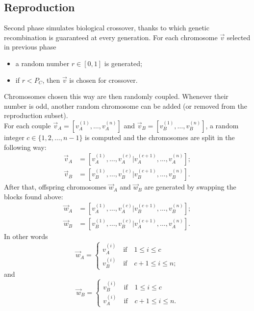 \documentclass[%
    corpo=11pt,
    twoside,
    stile=classica,
    oldstyle,
    autoretitolo,
    tipotesi=magistrale,
    greek,
    evenboxes,
    english
]{toptesi}
\begin{document}
\subsection{Reproduction}
Second phase simulates biological crossover, thanks to which genetic recombination is guaranteed at every generation. For each chromosome $\vec{v}$ selected in previous phase
\begin{itemize}
\item a random number  $r\in \left[0,1\right]$ is generated;
\item if $r < P_C$, then $\vec{v}$ is chosen for crossover.
\end{itemize}
Chromosomes chosen this way are then randomly coupled. Whenever their number is odd, another random chromosome can be added (or removed from the reproduction subset).\\
For each couple $\vec{v}_A = \left[v_A^{(1)}, \dots, v_A^{(n)} \right] $ and $\vec{v}_B = \left[v_B^{(1)}, \dots, v_B^{(n)} \right] $, a random integer 
$c \in \{1, 2, \dots, n - 1 \}$ is computed and the chromosomes are split in the following way:
\begin{align}
\vec{v}_A &= \left[v_A^{(1)}, \dots, v_A^{(c)} | v_A^{(c+1)}, \dots,  v_A^{(n)} \right]; \nonumber \\
\vec{v}_B &= \left[v_B^{(1)}, \dots, v_B^{(c)} | v_B^{(c+1)}, \dots,  v_B^{(n)} \right].
\end{align}
After that, offspring chromosomes $\vec{w}_A$ and $\vec{w}_B$ are generated by swapping the blocks found above:
\begin{align}
\vec{w}_A &= \left[v_A^{(1)}, \dots, v_A^{(c)} | v_B^{(c+1)}, \dots,  v_B^{(n)} \right]; \nonumber \\
\vec{w}_B &= \left[v_B^{(1)}, \dots, v_B^{(c)} | v_A^{(c+1)}, \dots,  v_A^{(n)} \right].
\end{align}
In other words
\begin{equation}
\vec{w}_A = \begin{cases}
v_A^{(i)} \quad \text{if} \quad 1 \leq i \leq c \\
v_B^{(i)} \quad \text{if} \quad c + 1 \leq i \leq n;
\end{cases} 
\end{equation}
and
\begin{equation}
\vec{w}_B = \begin{cases}
v_B^{(i)} \quad \text{if} \quad 1 \leq i \leq c \\
v_A^{(i)} \quad \text{if} \quad c + 1 \leq i \leq n.
\end{cases}
\end{equation}
\end{document}
